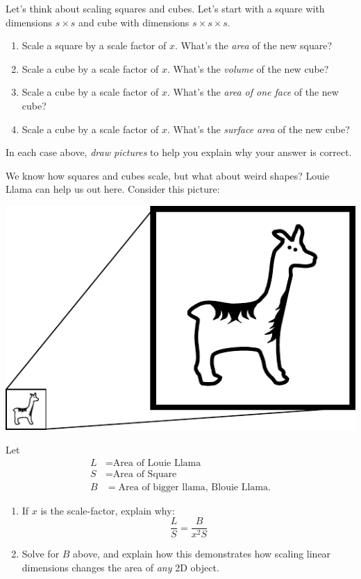 \documentclass[handout,nooutcomes,noauthor,hints]{ximera}
\begin{document}
\begin{question}
  Let's think about scaling squares and cubes. Let's start with a
  square with dimensions $s\times s$ and cube with dimensions $s\times
  s\times s$.
  \begin{enumerate}
  \item Scale a square by a scale factor of $x$. What's the \emph{area} of the new square?
  \item Scale a cube by a scale factor of $x$. What's the \emph{volume} of the new cube?
  \item Scale a cube by a scale factor of $x$. What's the \emph{area of one face} of the new cube?
  \item Scale a cube by a scale factor of $x$. What's the \emph{surface area} of the new cube?
  \end{enumerate}
  In each case above, \emph{draw pictures} to help you explain why your
  answer is correct.
\end{question}
\mynewpage

\begin{question}
  We know how squares and cubes scale, but what about weird shapes?
  Louie Llama can help us out here.  Consider this picture:
  \begin{center}
    \includegraphics{llamaScaled.pdf}
  \end{center}
  Let
  \begin{align*}
    L &= \text{Area of Louie Llama}\\
    S &= \text{Area of Square}\\
    B &= \text{Area of bigger llama, Blouie Llama}.
  \end{align*}
  \begin{enumerate}
  \item If $x$ is the scale-factor, explain why:
    \[
    \frac{L}{S} = \frac{B}{x^2 S}
    \]
  \item Solve for $B$ above, and explain how this demonstrates how
    scaling linear dimensions changes the area of \emph{any} 2D object.
  \end{enumerate}
  
\end{question}
\end{document}
